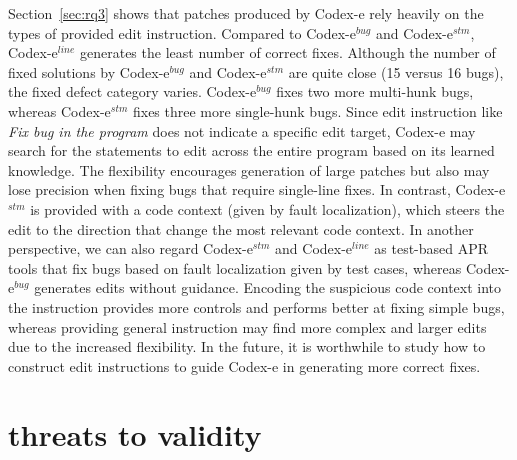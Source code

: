 Section~\ref{sec:rq3} shows that patches produced by Codex-e rely heavily on the types of provided edit instruction. Compared to Codex-e$^{bug}$ and Codex-e$^{stm}$, Codex-e$^{line}$ generates the least number of correct fixes. Although the number of fixed solutions by Codex-e$^{bug}$ and Codex-e$^{stm}$ are quite close (15 versus 16 bugs), the fixed defect category varies. Codex-e$^{bug}$ fixes two more multi-hunk bugs, whereas Codex-e$^{stm}$ fixes three more single-hunk bugs. Since edit instruction like \emph{Fix bug in the program} does not indicate a specific edit target, Codex-e may search for the statements to edit across the entire program based on its learned knowledge. The flexibility encourages generation of large patches but also may lose precision when fixing bugs that require single-line fixes. In contrast, Codex-e$^{stm}$ is provided with a code context (given by fault localization), which steers the edit to the direction that change the most relevant code context. In another perspective, we can also regard Codex-e$^{stm}$ and Codex-e$^{line}$ as test-based APR tools that fix bugs based on fault localization given by test cases, whereas Codex-e$^{bug}$ generates edits without guidance.  Encoding the suspicious code context into the instruction provides more controls and performs better at fixing simple bugs, whereas providing general instruction may find more complex and larger edits due to the increased flexibility. In the future, it is worthwhile to study how to construct edit instructions to guide Codex-e in generating more correct fixes. 

\section{threats to validity}

